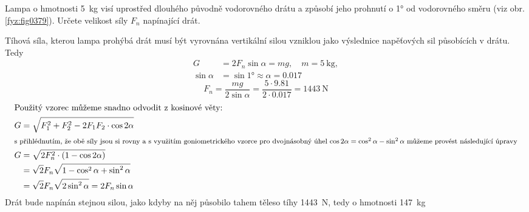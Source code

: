 \begin{mdframed}[style=mdexam]
  \begin{example}\label{fyz:fey_exam011}
    Lampa o hmotnosti \SI{5}{\kg} visí uprostřed dlouhého původně vodorovného drátu a způsobí jeho
    prohnutí o \ang{1} od vodorovného směru (viz obr. \ref{fyz:fig0379}). Určete velikost síly
    \(F_n\) napínající drát. 
        
    {\centering
    \captionsetup{type=figure}
    \par}
    
    Tíhová síla, kterou lampa prohýbá drát musí být vyrovnána vertikální silou vzniklou jako
    výslednice napěťových sil působících v drátu. Tedy
    \begin{align*}
               G &= 2F_n\sin\alpha = mg, \quad m = \SI{5}{\kg},   \\
      \sin\alpha &= \sin\ang{1} \approx \alpha = \num{0.017}
    \end{align*}
    \begin{equation*}
      F_n = \frac{mg}{2\sin\alpha} = \frac{\num{5}\cdot\num{9.81}}{2\cdot\num{0.017}}
          = \SI{1443}{\newton}
    \end{equation*}
    \begin{align*}
      \shortintertext{Použitý vzorec můžeme snadno odvodit z kosinové věty:}
      G &= \sqrt{F_1^2 + F_2^2 - 2F_1F_2\cdot\cos2\alpha}   \\
      \shortintertext{\footnotesize s přihlédnutím, že obě síly jsou si rovny a s využitím  
        goniometrického vzorce pro dvojnásobný úhel \(\cos2\alpha = \cos^2\alpha - \sin^2\alpha\) 
        můžeme provést následující úpravy} 
      G &= \sqrt{2F_n^2\cdot(1-\cos2\alpha)}                 \\
        &=\sqrt{2}F_n\sqrt{1-\cos^2\alpha+\sin^2\alpha}      \\
        &=\sqrt{2}F_n\sqrt{2\sin^2\alpha} = 2F_n\sin\alpha
    \end{align*}
    Drát bude napínán stejnou silou, jako kdyby na něj působilo tahem těleso tíhy
    \SI{1443}{\newton}, tedy o hmotnosti \SI{147}{\kg}
  \end{example}
\end{mdframed}  